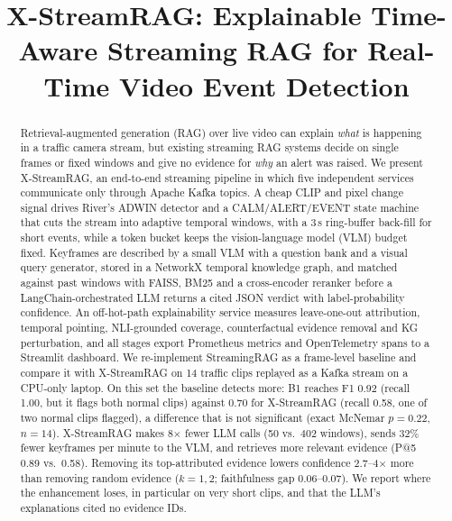 \documentclass[conference]{IEEEtran}
\newcommand{\TODO}[1]{\textcolor{red}{[TODO: #1]}}
\begin{document}
\title{X-StreamRAG: Explainable Time-Aware Streaming RAG for Real-Time Video Event Detection}

\author{\IEEEauthorblockN{\TODO{Member 1}, \TODO{Member 2}, \TODO{Member 3}, \TODO{Member 4}}
\IEEEauthorblockA{\TODO{Department, Institute}\\
IOE413 Streaming Data Analytics, Group 15 (Topic 7)\\
\TODO{emails}}}

\maketitle

\begin{abstract}
Retrieval-augmented generation (RAG) over live video can explain \emph{what} is happening in a traffic
camera stream, but existing streaming RAG systems decide on single frames or fixed windows and give
no evidence for \emph{why} an alert was raised. We present X-StreamRAG, an end-to-end streaming pipeline
in which five independent services communicate only through Apache Kafka topics. A cheap CLIP and pixel
change signal drives River's ADWIN detector and a CALM/ALERT/EVENT state machine that cuts the stream
into adaptive temporal windows, with a 3\,s ring-buffer back-fill for short events, while a token bucket keeps
the vision-language model (VLM) budget fixed. Keyframes are described by a small VLM with a question bank
and a visual query generator, stored in a NetworkX temporal knowledge graph, and matched against past
windows with FAISS, BM25 and a cross-encoder reranker before a LangChain-orchestrated LLM returns a
cited JSON verdict with label-probability confidence. An off-hot-path explainability service measures
leave-one-out attribution, temporal pointing, NLI-grounded coverage, counterfactual evidence removal and
KG perturbation, and all stages export Prometheus metrics and OpenTelemetry spans to a Streamlit dashboard.
We re-implement StreamingRAG as a frame-level baseline and compare it with X-StreamRAG on 14 traffic clips
replayed as a Kafka stream on a CPU-only laptop. On this set the baseline detects more: B1 reaches F1 0.92
(recall 1.00, but it flags both normal clips) against 0.70 for X-StreamRAG (recall 0.58, one of two normal clips
flagged), a difference that is not significant (exact McNemar $p=0.22$, $n=14$). X-StreamRAG makes 8$\times$
fewer LLM calls (50 vs.\ 402 windows), sends 32\% fewer keyframes per minute to the VLM, and retrieves more
relevant evidence (P@5 0.89 vs.\ 0.58). Removing its top-attributed evidence lowers confidence 2.7--4$\times$
more than removing random evidence ($k=1,2$; faithfulness gap 0.06--0.07). We report where the enhancement
loses, in particular on very short clips, and that the LLM's explanations cited no evidence IDs.
\end{abstract}
\end{document}
